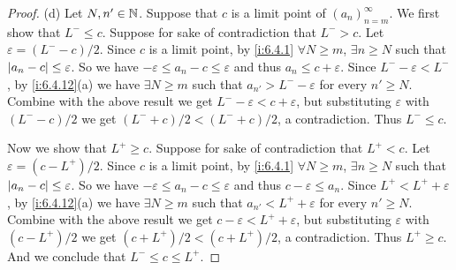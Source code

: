 \begin{proof}{(d)}
  Let \(N, n' \in \mathbb{N}\).
  Suppose that \(c\) is a limit point of \((a_n)_{n = m}^\infty\).
  We first show that \(L^- \leq c\).
  Suppose for sake of contradiction that \(L^- > c\).
  Let \(\varepsilon = (L^- - c) / 2\).
  Since \(c\) is a limit point, by \cref{i:6.4.1} \(\forall N \geq m\), \(\exists n \geq N\) such that \(\left\lvert a_n - c\right\rvert \leq \varepsilon\).
  So we have \(-\varepsilon \leq a_n - c \leq \varepsilon\) and thus \(a_n \leq c + \varepsilon\).
  Since \(L^- - \varepsilon < L^-\), by \cref{i:6.4.12}(a) we have \(\exists N \geq m\) such that \(a_{n'} > L^- - \varepsilon\) for every \(n' \geq N\).
  Combine with the above result we get \(L^- - \varepsilon < c + \varepsilon\), but substituting \(\varepsilon\) with \((L^- - c) / 2\) we get \((L^- + c) / 2 < (L^- + c) / 2\), a contradiction.
  Thus \(L^- \leq c\).

  Now we show that \(L^+ \geq c\).
  Suppose for sake of contradiction that \(L^+ < c\).
  Let \(\varepsilon = (c - L^+) / 2\).
  Since \(c\) is a limit point, by \cref{i:6.4.1} \(\forall N \geq m\), \(\exists n \geq N\) such that \(\left\lvert a_n - c\right\rvert \leq \varepsilon\).
  So we have \(-\varepsilon \leq a_n - c \leq \varepsilon\) and thus \(c - \varepsilon \leq a_n\).
  Since \(L^+ < L^+ + \varepsilon\), by \cref{i:6.4.12}(a) we have \(\exists N \geq m\) such that \(a_{n'} < L^+ + \varepsilon\) for every \(n' \geq N\).
  Combine with the above result we get \(c - \varepsilon < L^+ + \varepsilon\), but substituting \(\varepsilon\) with \((c - L^+) / 2\) we get \((c + L^+) / 2 < (c + L^+) / 2\), a contradiction.
  Thus \(L^+ \geq c\).
  And we conclude that \(L^- \leq c \leq L^+\).
\end{proof}

